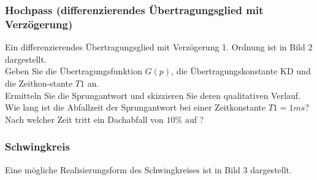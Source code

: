 \subsubsection{Hochpass (differenzierendes Übertragungsglied mit Verzögerung)}

Ein differenzierendes Übertragungsglied mit Verzögerung 1. Ordnung ist in Bild 2 dargestellt.\\
Geben  Sie  die  Übertragungsfunktion $G(p)$,  die  Übertragungskonstante  KD und die Zeitkon-stante $T1$ an.\\ 
Ermitteln Sie die Sprungantwort und skizzieren Sie deren qualitativen Verlauf.\\ 
Wie lang ist die Abfallzeit der Sprungantwort bei einer Zeitkonstante $T1 = 1 ms$?\\ 
Nach welcher Zeit tritt ein Dachabfall von $10\%$ auf ?\\

\subsubsection{Schwingkreis}

Eine mögliche Realisierungsform des Schwingkreises ist in Bild 3 dargestellt.\\

